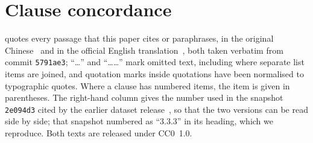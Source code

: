 \section{Clause concordance}
\label{app:concordance}

 quotes every \pol{} passage that this paper cites or paraphrases, in the original Chinese~\cite{pol2text} and in the official English translation~\cite{pol2en}, both taken verbatim from commit \texttt{5791ae3}; ``\ldots'' and ``……'' mark omitted text, including where separate list items are joined, and quotation marks inside quotations have been normalised to typographic quotes.
Where a clause has numbered items, the item is given in parentheses.
The right-hand column gives the number used in the snapshot \texttt{2e094d3} cited by the earlier dataset release~\cite{survey01}, so that the two versions can be read side by side; that snapshot numbered  as ``3.3.3'' in its heading, which we reproduce.
Both texts are released under CC0~1.0.

